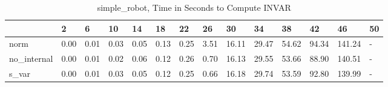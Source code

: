 \begin{table}
\caption{simple_robot, Time in Seconds to Compute INVAR}
\label{simple_robot_INVAR_time}
\begin{tabular}{llllllllllllll}
\toprule
 & 2 & 6 & 10 & 14 & 18 & 22 & 26 & 30 & 34 & 38 & 42 & 46 & 50 \\
\midrule
norm & 0.00 & 0.01 & 0.03 & 0.05 & 0.13 & 0.25 & 3.51 & 16.11 & 29.47 & 54.62 & 94.34 & 141.24 & - \\
no_internal & 0.00 & 0.01 & 0.02 & 0.06 & 0.12 & 0.26 & 0.70 & 16.13 & 29.55 & 53.66 & 88.90 & 140.51 & - \\
s_var & 0.00 & 0.01 & 0.03 & 0.05 & 0.12 & 0.25 & 0.66 & 16.18 & 29.74 & 53.59 & 92.80 & 139.99 & - \\
\bottomrule
\end{tabular}
\end{table}
